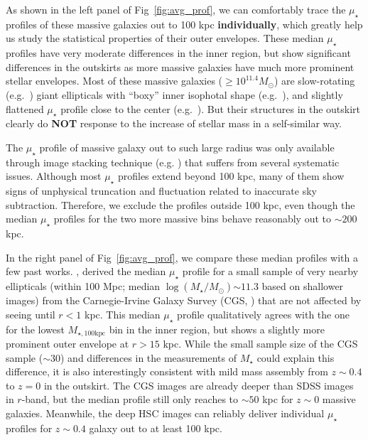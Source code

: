 \documentclass{emulateapj}
\def\mstar{{$M_{\star}$}}
\def\logms{{$\log (M_{\star}/M_{\odot})$}}
\def\mtot{{$M_{\star,100\mathrm{kpc}}$}}
\def\mden{{$\mu_{\star}$}}
\begin{document}
\begin{CJK*}{UTF8}{gbsn}
    As shown in the left panel of Fig~\ref{fig:avg_prof}, we can comfortably trace 
    the \mden{} profiles of these massive galaxies out to 100 kpc \textbf{individually}, 
    which greatly help us study the statistical properties of their outer envelopes. 
    These median \mden{} profiles have very moderate differences in the inner region, 
    but show significant differences in the outskirts as more massive galaxies have 
    much more prominent stellar envelopes.
    Most of these massive galaxies ($\ge 10^{11.4} M_{\odot}$) are slow-rotating 
    (e.g.\ \citealt{Cappellari13b}) giant ellipticals with ``boxy'' inner isophotal 
    shape (e.g.\ \citealt{Kormendy2009}), and slightly flattened \mden{} profile close 
    to the center (e.g.\ \citealt{Lauer07}).
    But their structures in the outskirt clearly do \textbf{NOT} response to the 
    increase of stellar mass in a self-similar way.
    
    The \mden{} profile of massive galaxy out to such large radius was only available 
    through image stacking technique (e.g. \citealt{Tal2011, DSouza2015})
    that suffers from several systematic issues.
    Although most \mden{} profiles extend beyond 100 kpc, many of them show signs of 
    unphysical truncation and fluctuation related to inaccurate sky subtraction.  
    Therefore, we exclude the profiles outside 100 kpc, even though the median \mden{} 
    profiles for the two more massive bins behave reasonably out to $\sim 200$ kpc. 
          
    In the right panel of Fig~\ref{fig:avg_prof}, we compare these median profiles with 
    a few past works.  
    \citep{Huang2013a}, derived the median \mden{} profile for a small sample of very 
    nearby ellipticals (within 100 Mpc; median \logms{}$\sim 11.3$ based on shallower 
    images) from the Carnegie-Irvine Galaxy Survey (CGS, \citealt{CGS1}) that are not 
    affected by seeing until $r < 1$ kpc.
    This median \mden{} profile qualitatively agrees with the one for the lowest 
    \mtot{} bin in the inner region, but shows a slightly more prominent outer 
    envelope at $r > 15$ kpc. 
    While the small sample size of the CGS sample ($\sim 30$) and differences in the
    measurements of \mstar{} could explain this difference, it is also interestingly 
    consistent with mild mass assembly from $z\sim 0.4$ to $z=0$ in the outskirt.   
    The CGS images are already deeper than SDSS images in $r$-band, but the median 
    profile still only reaches to $\sim 50$ kpc for $z\sim 0$ massive galaxies.
    Meanwhile, the deep HSC images can reliably deliver individual \mden{} profiles 
    for $z\sim 0.4$ galaxy out to at least 100 kpc.  
    

\end{CJK*}
\end{document}
